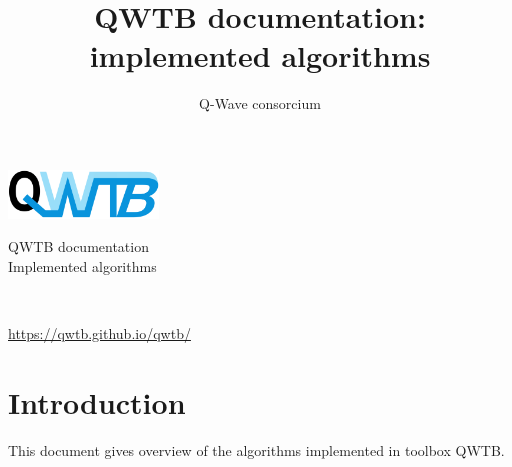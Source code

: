 \documentclass[12pt,a4paper,oneside]{report} %
\begin{document}
\renewcommand\floatpagefraction{.9} \renewcommand\topfraction{.9} \renewcommand\bottomfraction{.9} \renewcommand\textfraction{.1} \setcounter{totalnumber}{50} \setcounter{topnumber}{50} \setcounter{bottomnumber}{50} %
\renewcommand{\labelitemi}{--}          %
\setlength{\unitlength}{1mm}            %

\newenvironment{tightdesc}{\begin{description}[itemsep=0pt]} 
                              {\end{description}}

\def\infosection{Description}
\def\examplesection{Example}
\renewcommand{\chaptername}{}

\title{QWTB documentation: implemented algorithms}
\author{Q-Wave consorcium}

\thispagestyle{empty}
\begin{center}
        \vspace*{10em}
        {\huge
        \includegraphics[width=0.3\textwidth]{logo/qwtb_logo.png}

        \vspace{2.0em}
        QWTB documentation\\

        \vspace{1.5em}
        Implemented algorithms}\\

        \vfill
        {\Large \color{red}{QWTB version 0.2}}

        \vspace{1em}
        {\Large \url{https://qwtb.github.io/qwtb/}}
\end{center}
\newpage

\tableofcontents

\chapter{Introduction} %
This document gives overview of the algorithms implemented in toolbox QWTB.
\end{document}
